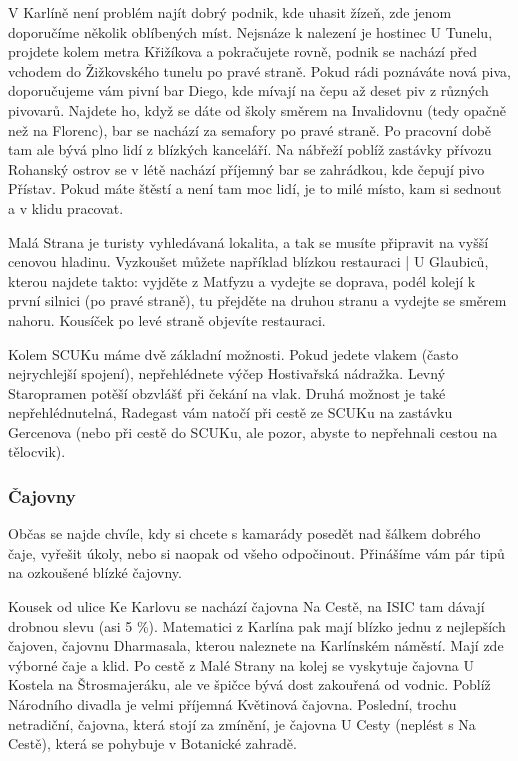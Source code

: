 V Karlíně není problém najít dobrý podnik, kde uhasit žízeň, zde jenom
doporučíme několik oblíbených míst. Nejsnáze k nalezení je hostinec U Tunelu,
projdete kolem metra Křižíkova a pokračujete rovně, podnik se nachází před
vchodem do Žižkovského tunelu po pravé straně. Pokud rádi poznáváte nová piva,
doporučujeme vám pivní bar Diego, kde mívají na čepu až deset piv z různých
pivovarů. Najdete ho, když se dáte od školy směrem na Invalidovnu (tedy opačně
než na Florenc), bar se nachází za semafory po pravé straně. Po pracovní době
tam ale bývá plno lidí z blízkých kanceláří. Na nábřeží poblíž zastávky přívozu
Rohanský ostrov se v létě nachází příjemný bar se zahrádkou, kde čepují pivo
Přístav. Pokud máte štěstí a není tam moc lidí, je to milé místo, kam si sednout
a v klidu pracovat.

Malá Strana je turisty vyhledávaná lokalita, a tak se musíte připravit na vyšší
cenovou hladinu. Vyzkoušet můžete například blízkou restauraci | U Glaubiců,
kterou najdete takto: vyjděte z Matfyzu a vydejte se doprava, podél kolejí k
první silnici (po pravé straně), tu přejděte na druhou stranu a vydejte se
směrem nahoru. Kousíček po levé straně objevíte restauraci.

Kolem SCUKu máme dvě základní možnosti. Pokud jedete vlakem (často nejrychlejší
spojení), nepřehlédnete výčep Hostivařská nádražka. Levný Staropramen potěší
obzvlášť při čekání na vlak. Druhá možnost je také nepřehlédnutelná, Radegast
vám natočí při cestě ze SCUKu na zastávku Gercenova (nebo při cestě do SCUKu,
ale pozor, abyste to nepřehnali cestou na tělocvik).


\subsubsection{Čajovny}
Občas se najde chvíle, kdy si chcete s kamarády posedět nad šálkem dobrého čaje,
vyřešit úkoly, nebo si naopak od všeho odpočinout. Přinášíme vám pár tipů na
ozkoušené blízké čajovny.

Kousek od ulice Ke Karlovu se nachází čajovna Na Cestě, na ISIC tam dávají
drobnou slevu (asi 5 \%). Matematici z Karlína pak mají blízko jednu z
nejlepších čajoven, čajovnu Dharmasala, kterou naleznete na Karlínském náměstí.
Mají zde výborné čaje a klid. Po cestě z Malé Strany na kolej se vyskytuje
čajovna U Kostela na Štrosmajeráku, ale ve špičce bývá dost zakouřená od vodnic.
Poblíž Národního divadla je velmi příjemná Květinová čajovna. Poslední, trochu
netradiční, čajovna, která stojí za zmínění, je čajovna U Cesty (neplést s Na
Cestě), která se pohybuje v Botanické zahradě.

